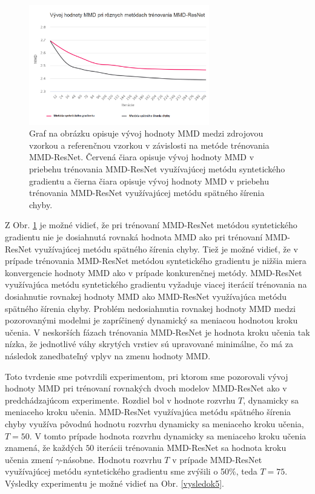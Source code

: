 \begin{figure}
\centerline{\includegraphics[width=0.7\textwidth]{images/experimenty/experiment4.png}}
\caption[Vývoj hodnoty MMD pri rôznych metódach trénovania MMD-ResNet]{Graf na obrázku opisuje vývoj hodnoty MMD medzi zdrojovou vzorkou a referenčnou vzorkou v závislosti na metóde trénovania MMD-ResNet. Červená čiara opisuje vývoj hodnoty MMD v priebehu trénovania MMD-ResNet využívajúcej metódu syntetického gradientu a čierna čiara opisuje vývoj hodnoty MMD v priebehu trénovania MMD-ResNet využívajúcej metódu spätného šírenia chyby.}
\label{vysledok4}
\end{figure}

Z Obr. \ref{vysledok4} je možné vidieť, že pri trénovaní MMD-ResNet metódou syntetického gradientu nie je dosiahnutá rovnaká hodnota MMD ako pri trénovaní MMD-ResNet využívajúcej metódu spätného šírenia chyby. Tiež je možné vidieť, že v prípade trénovania MMD-ResNet metódou syntetického gradientu je nižšia miera konvergencie hodnoty MMD ako v prípade konkurenčnej metódy. MMD-ResNet využívajúca metódu syntetického gradientu vyžaduje viacej iterácií trénovania na dosiahnutie rovnakej hodnoty MMD ako MMD-ResNet využívajúca metódu spätného šírenia chyby. Problém nedosiahnutia rovnakej hodnoty MMD medzi pozorovanými modelmi je zapríčinený dynamický sa meniacou hodnotou kroku učenia. V neskorších fázach trénovania MMD-ResNet je hodnota kroku učenia tak nízka, že jednotlivé váhy skrytých vrstiev sú upravované minimálne, čo má za následok zanedbateľný vplyv na zmenu hodnoty MMD.

Toto tvrdenie sme potvrdili experimentom, pri ktorom sme pozorovali vývoj hodnoty MMD pri trénovaní rovnakých dvoch modelov MMD-ResNet ako v predchádzajúcom experimente. Rozdiel bol v hodnote rozvrhu $T$, dynamicky sa meniaceho kroku učenia. MMD-ResNet využívajúca metódu spätného šírenia chyby využíva pôvodnú hodnotu rozvrhu dynamicky sa meniaceho kroku učenia, $T=50$. V tomto prípade hodnota rozvrhu dynamicky sa meniaceho kroku učenia znamená, že každých $50$ iterácii trénovania MMD-ResNet sa hodnota kroku učenia zmení $\gamma$-násobne. Hodnotu rozvrhu $T$ v prípade MMD-ResNet využívajúcej metódu syntetického gradientu sme zvýšili o 50\%, teda $T=75$. Výsledky experimentu je možné vidieť na Obr. \ref{vysledok5}.

